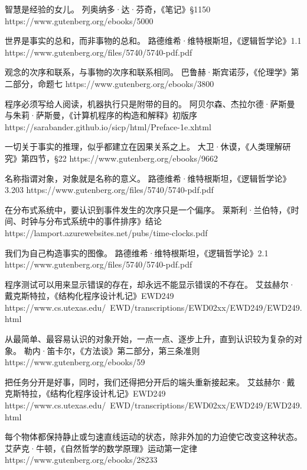 %
  {智慧是经验的女儿。}%
  {列奥纳多·达·芬奇，《笔记》§1150}%
  {https://www.gutenberg.org/ebooks/5000}

%
  {世界是事实的总和，而非事物的总和。}%
  {路德维希·维特根斯坦，《逻辑哲学论》1.1}%
  {https://www.gutenberg.org/files/5740/5740-pdf.pdf}

%
  {观念的次序和联系，与事物的次序和联系相同。}%
  {巴鲁赫·斯宾诺莎，《伦理学》第二部分，命题七}%
  {https://www.gutenberg.org/ebooks/3800}

%
  {程序必须写给人阅读，机器执行只是附带的目的。}%
  {阿贝尔森、杰拉尔德·萨斯曼与朱莉·萨斯曼，《计算机程序的构造和解释》初版序}%
  {https://sarabander.github.io/sicp/html/Preface-1e.xhtml}

%
  {一切关于事实的推理，似乎都建立在因果关系之上。}%
  {大卫·休谟，《人类理解研究》第四节，§22}%
  {https://www.gutenberg.org/ebooks/9662}

%
  {名称指谓对象，对象就是名称的意义。}%
  {路德维希·维特根斯坦，《逻辑哲学论》3.203}%
  {https://www.gutenberg.org/files/5740/5740-pdf.pdf}

%
  {在分布式系统中，要认识到事件发生的次序只是一个偏序。}%
  {莱斯利·兰伯特，《时间、时钟与分布式系统中的事件排序》结论}%
  {https://lamport.azurewebsites.net/pubs/time-clocks.pdf}

%
  {我们为自己构造事实的图像。}%
  {路德维希·维特根斯坦，《逻辑哲学论》2.1}%
  {https://www.gutenberg.org/files/5740/5740-pdf.pdf}

%
  {程序测试可以用来显示错误的存在，却永远不能显示错误的不存在。}%
  {艾兹赫尔·戴克斯特拉，《结构化程序设计札记》EWD249}%
  {https://www.cs.utexas.edu/~EWD/transcriptions/EWD02xx/EWD249/EWD249.html}

%
  {从最简单、最容易认识的对象开始，一点一点、逐步上升，直到认识较为复杂的对象。}%
  {勒内·笛卡尔，《方法谈》第二部分，第三条准则}%
  {https://www.gutenberg.org/ebooks/59}

%
  {把任务分开是好事，同时，我们还得把分开后的端头重新接起来。}%
  {艾兹赫尔·戴克斯特拉，《结构化程序设计札记》EWD249}%
  {https://www.cs.utexas.edu/~EWD/transcriptions/EWD02xx/EWD249/EWD249.html}

%
  {每个物体都保持静止或匀速直线运动的状态，除非外加的力迫使它改变这种状态。}%
  {艾萨克·牛顿，《自然哲学的数学原理》运动第一定律}%
  {https://www.gutenberg.org/ebooks/28233}

